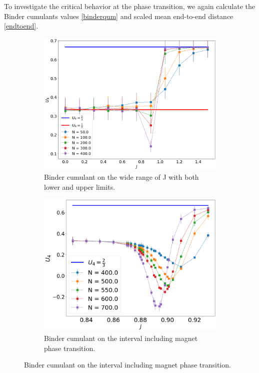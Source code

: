To investigate the critical behavior at the phase transition, we again calculate  the Binder cumulants values \eqref{binderqum} and scaled mean end-to-end distance  \eqref{endtoend}.
 \begin{figure}
	\centering
	\captionsetup{justification=centering}
	\begin{subfigure}[b]{0.45\textwidth}
		\includegraphics[width=\textwidth]{Images/3_bindercumulants_shortchains.png}
		\caption{Binder cumulant on the wide range of J with both lower and upper limits. }
		\label{fig:bcshort_shortbc_3}
	\end{subfigure}
	\begin{subfigure}[b]{0.45\textwidth}
		\includegraphics[width=\textwidth]{Images/3_bindercumulants_longchains.png}
		\caption{Binder cumulant on the interval including magnet phase transition.}
		\label{fig:bcshort_longbc_3}
	\end{subfigure}



\end{figure}

